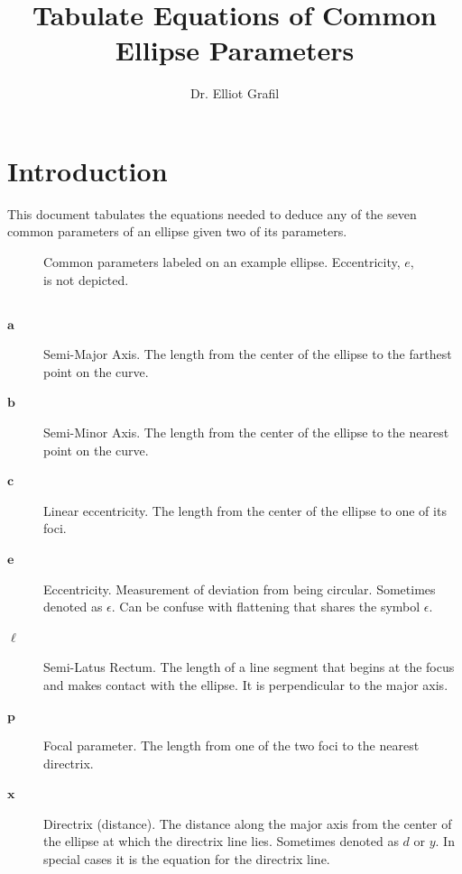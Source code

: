 \documentclass{article}
\title{\vspace{-2.5cm}Tabulate Equations of Common Ellipse Parameters}
\author{Dr. Elliot Grafil}
\begin{document}
\maketitle
\section*{Introduction}
This document tabulates the equations needed to deduce any of the seven common parameters of an ellipse given two of its parameters. 
\begin{figure}[H]
\begin{center}
\noindent{}
  \caption{Common parameters labeled on an example ellipse. Eccentricity, $e$, is not depicted.}
  \label{fig:boat1}
  \end{center}
\end{figure}
\subsection*{}
\begin{description}
\item[$\boldsymbol{a}$] Semi-Major Axis. The length from the center of the ellipse to the farthest point on the curve.
\item[$\boldsymbol{b}$] Semi-Minor Axis. The length from the center of the ellipse to the nearest point on the curve.
\item[$\boldsymbol{c}$] Linear eccentricity. The length from the center of the ellipse to one of its foci.
\item[$\boldsymbol{e}$] Eccentricity. Measurement of deviation from being circular. Sometimes denoted as $\epsilon$. Can be confuse with flattening that shares the symbol $\epsilon$.
\item[$\boldsymbol{\ell}$] Semi-Latus Rectum. The length of a line segment that begins at the focus and makes contact with the ellipse. It is perpendicular to the major axis.
\item[$\boldsymbol{p}$] Focal parameter. The length from one of the two foci to the nearest directrix.
\item[$\boldsymbol{x}$] Directrix (distance). The distance along the major axis from the center of the ellipse at which the directrix line lies. Sometimes denoted as $d$ or $y$. In special cases it is the equation for the directrix line. 
\end{description}
\end{document}
